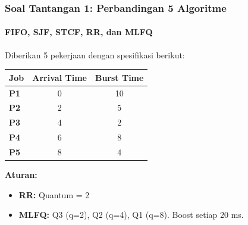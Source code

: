 \documentclass[t,aspectratio=169,xcolor=dvipsnames]{beamer}
\begin{document}
\begin{frame}
    \frametitle{Soal Tantangan 1: Perbandingan 5 Algoritme}
    \framesubtitle{FIFO, SJF, STCF, RR, dan MLFQ}
    \small
    Diberikan 5 pekerjaan dengan spesifikasi berikut:
    \begin{table}[]
        \centering
        \begin{tabular}{lcc}
            \toprule
            \textbf{Job} & \textbf{Arrival Time} & \textbf{Burst Time} \\
            \midrule
            \textbf{P1} & 0 & 10 \\
            \textbf{P2} & 2 & 5 \\
            \textbf{P3} & 4 & 2 \\
            \textbf{P4} & 6 & 8 \\
            \textbf{P5} & 8 & 4 \\
            \bottomrule
        \end{tabular}
    \end{table}
    \vspace{0.2cm}
    \textbf{Aturan:}
    \begin{itemize}
        \item \textbf{RR:} Quantum = 2
        \item \textbf{MLFQ:} Q3 (q=2), Q2 (q=4), Q1 (q=8). Boost setiap 20 ms.
    \end{itemize}
\end{frame}
\end{document}
